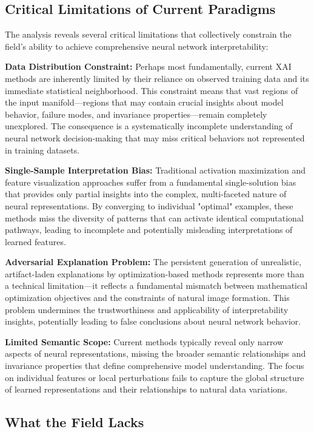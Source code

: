 \subsection{Critical Limitations of Current Paradigms}

The analysis reveals several critical limitations that collectively constrain the field's ability to achieve comprehensive neural network interpretability:

\textbf{Data Distribution Constraint:} Perhaps most fundamentally, current XAI methods are inherently limited by their reliance on observed training data and its immediate statistical neighborhood. This constraint means that vast regions of the input manifold—regions that may contain crucial insights about model behavior, failure modes, and invariance properties—remain completely unexplored. The consequence is a systematically incomplete understanding of neural network decision-making that may miss critical behaviors not represented in training datasets.

\textbf{Single-Sample Interpretation Bias:} Traditional activation maximization and feature visualization approaches suffer from a fundamental single-solution bias that provides only partial insights into the complex, multi-faceted nature of neural representations. By converging to individual "optimal" examples, these methods miss the diversity of patterns that can activate identical computational pathways, leading to incomplete and potentially misleading interpretations of learned features.

\textbf{Adversarial Explanation Problem:} The persistent generation of unrealistic, artifact-laden explanations by optimization-based methods represents more than a technical limitation—it reflects a fundamental mismatch between mathematical optimization objectives and the constraints of natural image formation. This problem undermines the trustworthiness and applicability of interpretability insights, potentially leading to false conclusions about neural network behavior.

\textbf{Limited Semantic Scope:} Current methods typically reveal only narrow aspects of neural representations, missing the broader semantic relationships and invariance properties that define comprehensive model understanding. The focus on individual features or local perturbations fails to capture the global structure of learned representations and their relationships to natural data variations.

\subsection{What the Field Lacks}

